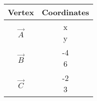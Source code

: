 \begin{tabular}[12pt]{ |c| c|}
    \hline
    \textbf{Vertex} & \textbf{Coordinates}\\ 
    \hline
   $\vec{A}$ & \myvec{x \\ y} \\
    \hline 
   $\vec{B}$ & \myvec{-4 \\ 6}\\
    \hline
   $\vec{C}$ & \myvec{-2 \\ 3}\\
    \hline
    \end{tabular}
